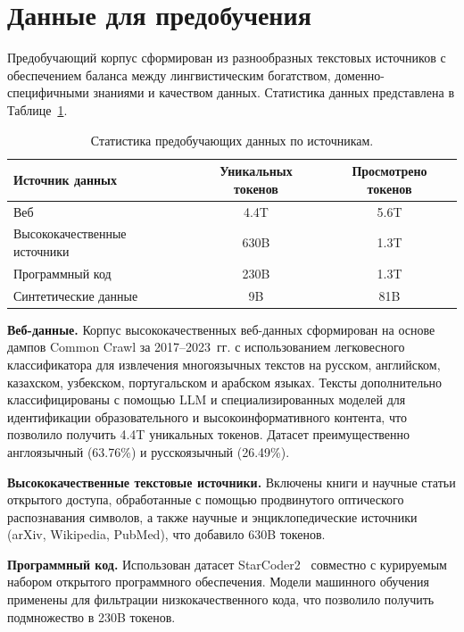 \section{Данные для предобучения}\label{sec:gc_pretrain_data}

Предобучающий корпус сформирован из разнообразных текстовых источников с обеспечением баланса между лингвистическим богатством, доменно-специфичными знаниями и качеством данных. Статистика данных представлена в Таблице~\ref{tab:gc_pretrain_data}.

\begin{table}[H]
    \centering
    \caption{Статистика предобучающих данных по источникам.}
    \label{tab:gc_pretrain_data}
    \begin{tabular}{lcc}
        \toprule
        Источник данных & Уникальных токенов & Просмотрено токенов \\
        \midrule
        Веб                          & 4.4T & 5.6T \\
        Высококачественные источники & 630B & 1.3T \\
        Программный код              & 230B & 1.3T \\
        Синтетические данные         & 9B   & 81B  \\
        \bottomrule
    \end{tabular}
\end{table}

\textbf{Веб-данные.} Корпус высококачественных веб-данных сформирован на основе дампов Common Crawl за 2017--2023~гг. с использованием легковесного классификатора для извлечения многоязычных текстов на русском, английском, казахском, узбекском, португальском и арабском языках. Тексты дополнительно классифицированы с помощью LLM и специализированных моделей для идентификации образовательного и высокоинформативного контента, что позволило получить 4.4T уникальных токенов. Датасет преимущественно англоязычный (63.76\%) и русскоязычный (26.49\%).

\textbf{Высококачественные текстовые источники.} Включены книги и научные статьи открытого доступа, обработанные с помощью продвинутого оптического распознавания символов, а также научные и энциклопедические источники (arXiv, Wikipedia, PubMed), что добавило 630B токенов.

\textbf{Программный код.} Использован датасет StarCoder2~\cite{lozhkov2024starcoder2} совместно с курируемым набором открытого программного обеспечения. Модели машинного обучения применены для фильтрации низкокачественного кода, что позволило получить подмножество в 230B токенов.

